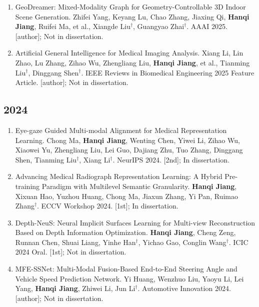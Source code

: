{\begin{enumerate}
\item GeoDreamer: Mixed-Modality Graph for Geometry-Controllable 3D Indoor Scene Generation. Zhifei Yang, Keyang Lu, Chao Zhang, Jiaxing Qi, \textbf{Hanqi Jiang}, Ruifei Ma, et al., Xiangde Liu$^{\dagger}$, Guangyao Zhai$^{\dagger}$. AAAI 2025. [author]; Not in dissertation.
\item Artificial General Intelligence for Medical Imaging Analysis. Xiang Li, Lin Zhao, Lu Zhang, Zihao Wu, Zhengliang Liu, \textbf{Hanqi Jiang}, et al., Tianming Liu$^{\dagger}$, Dinggang Shen$^{\dagger}$. IEEE Reviews in Biomedical Engineering 2025 Feature Article. [author]; Not in dissertation.
\end{enumerate}
\subsection*{2024}
\begin{enumerate}\renewcommand{\labelenumi}{[\arabic{enumi}]}\setlength{\itemsep}{2pt}\setlength{\parsep}{0pt}\setlength{\topsep}{0pt}
\setcounter{enumi}{16}
\item Eye-gaze Guided Multi-modal Alignment for Medical Representation Learning. Chong Ma, \textbf{Hanqi Jiang}, Wenting Chen, Yiwei Li, Zihao Wu, Xiaowei Yu, Zhengliang Liu, Lei Guo, Dajiang Zhu, Tuo Zhang, Dinggang Shen, Tianming Liu$^{\dagger}$, Xiang Li$^{\dagger}$. NeurIPS 2024. [2nd]; In dissertation.
\item Advancing Medical Radiograph Representation Learning: A Hybrid Pre-training Paradigm with Multilevel Semantic Granularity. \textbf{Hanqi Jiang}, Xixuan Hao, Yuzhou Huang, Chong Ma, Jiaxun Zhang, Yi Pan, Ruimao Zhang$^{\dagger}$. ECCV Workshop 2024. [1st]; In dissertation.
\item Depth-NeuS: Neural Implicit Surfaces Learning for Multi-view Reconstruction Based on Depth Information Optimization. \textbf{Hanqi Jiang}, Cheng Zeng, Runnan Chen, Shuai Liang, Yinhe Han$^{\dagger}$, Yichao Gao, Conglin Wang$^{\dagger}$. ICIC 2024 Oral. [1st]; Not in dissertation.
\item MFE-SSNet: Multi-Modal Fusion-Based End-to-End Steering Angle and Vehicle Speed Prediction Network. Yi Huang, Wenzhuo Liu, Yaoyu Li, Lei Yang, \textbf{Hanqi Jiang}, Zhiwei Li, Jun Li$^{\dagger}$. Automotive Innovation 2024. [author]; Not in dissertation.
\end{enumerate}
}
